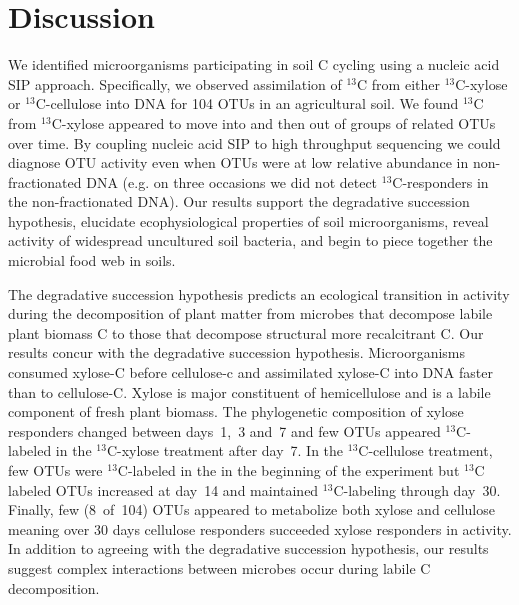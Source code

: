 \section{Discussion} 
We identified microorganisms participating in soil C cycling using a nucleic
acid SIP approach. Specifically, we observed assimilation of $^{13}$C from
either $^{13}$C-xylose or $^{13}$C-cellulose into DNA for 104 OTUs in an 
agricultural soil. We found $^{13}$C from $^{13}$C-xylose appeared to
move into and then out of groups of related OTUs over time. By coupling nucleic
acid SIP to high throughput sequencing we could diagnose OTU activity even when
OTUs were at low relative abundance in non-fractionated DNA (e.g. on three
occasions we did not detect $^{13}$C-responders in the non-fractionated DNA).
Our results support the degradative succession hypothesis, elucidate
ecophysiological properties of soil microorganisms, reveal activity of
widespread uncultured soil bacteria, and begin to piece together the microbial
food web in soils. 

The degradative succession hypothesis predicts an ecological transition in
activity during the decomposition of plant matter from microbes that decompose
labile plant biomass C to those that decompose structural more recalcitrant C.
Our results concur with the degradative succession hypothesis. Microorganisms
consumed xylose-C before cellulose-c and assimilated xylose-C into DNA faster
than to cellulose-C. Xylose is major constituent of hemicellulose and is
a labile component of fresh plant biomass. The phylogenetic composition of
xylose responders changed between days~1,~3 and~7 and few OTUs appeared
$^{13}$C-labeled in the $^{13}$C-xylose treatment after day~7. In the
$^{13}$C-cellulose treatment, few OTUs were $^{13}$C-labeled in the in the
beginning of the experiment but $^{13}$C labeled OTUs increased at day~14 and
maintained $^{13}$C-labeling through day~30. Finally, few (8~of~104) OTUs
appeared to metabolize both xylose and cellulose meaning over 30 days cellulose
responders succeeded xylose responders in activity. In addition to agreeing
with the degradative succession hypothesis, our results suggest complex
interactions between microbes occur during labile C decomposition.

